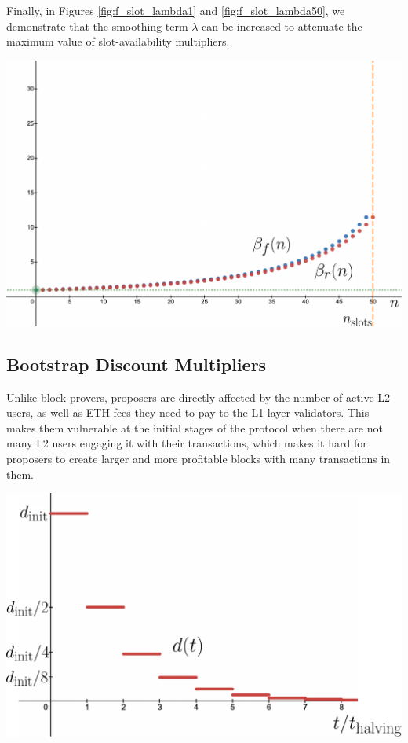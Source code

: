 \documentclass[9pt,oneside]{amsart}
\newenvironment{Figure}
  {\par\medskip\noindent\minipage{\linewidth}}
  {\endminipage\par\medskip}
\begin{document}
\begin{multicols}{2}
Finally, in Figures \ref{fig:f_slot_lambda1} and \ref{fig:f_slot_lambda50}, we demonstrate that the smoothing term $\lambda$ can be increased to attenuate the maximum value of slot-availability multipliers.

\begin{Figure}
 \centering
 \includegraphics[width=\linewidth]{fig/lambda20.png}
 \label{fig:f_slot_lambda50}
 
\end{Figure}

\subsection{Bootstrap Discount Multipliers}\label{sec:bootstrapping}
Unlike block provers, proposers are directly affected by the number of active L2 users, as well as ETH fees they need to pay to the L1-layer validators. This makes them vulnerable at the initial stages of the protocol when there are not many L2 users engaging it with their transactions, which makes it hard for proposers to create larger and more profitable blocks with many transactions in them.

\begin{Figure}
 \centering
 \includegraphics[width=0.7\linewidth]{fig/discount_func.png}
 \label{fig:discount}
\end{Figure}


\end{multicols}
\end{document}

